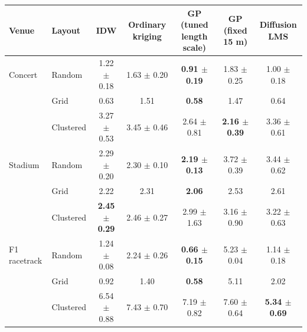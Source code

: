 \begin{tabular}{llccccc}
\toprule
Venue & Layout & IDW & Ordinary kriging & GP (tuned length scale) & GP (fixed 15 m) & Diffusion LMS \\
\midrule
Concert & Random & 1.22 $\pm$ 0.18 & 1.63 $\pm$ 0.20 & \textbf{0.91 $\pm$ 0.19} & 1.83 $\pm$ 0.25 & 1.00 $\pm$ 0.18 \\
 & Grid & 0.63 & 1.51 & \textbf{0.58} & 1.47 & 0.64 \\
 & Clustered & 3.27 $\pm$ 0.53 & 3.45 $\pm$ 0.46 & 2.64 $\pm$ 0.81 & \textbf{2.16 $\pm$ 0.39} & 3.36 $\pm$ 0.61 \\
\midrule
Stadium & Random & 2.29 $\pm$ 0.20 & 2.30 $\pm$ 0.10 & \textbf{2.19 $\pm$ 0.13} & 3.72 $\pm$ 0.39 & 3.44 $\pm$ 0.62 \\
 & Grid & 2.22 & 2.31 & \textbf{2.06} & 2.53 & 2.61 \\
 & Clustered & \textbf{2.45 $\pm$ 0.29} & 2.46 $\pm$ 0.27 & 2.99 $\pm$ 1.63 & 3.16 $\pm$ 0.90 & 3.22 $\pm$ 0.63 \\
\midrule
F1 racetrack & Random & 1.24 $\pm$ 0.08 & 2.24 $\pm$ 0.26 & \textbf{0.66 $\pm$ 0.15} & 5.23 $\pm$ 0.04 & 1.14 $\pm$ 0.18 \\
 & Grid & 0.92 & 1.40 & \textbf{0.58} & 5.11 & 2.02 \\
 & Clustered & 6.54 $\pm$ 0.88 & 7.43 $\pm$ 0.70 & 7.19 $\pm$ 0.82 & 7.60 $\pm$ 0.64 & \textbf{5.34 $\pm$ 0.69} \\
\bottomrule
\end{tabular}
